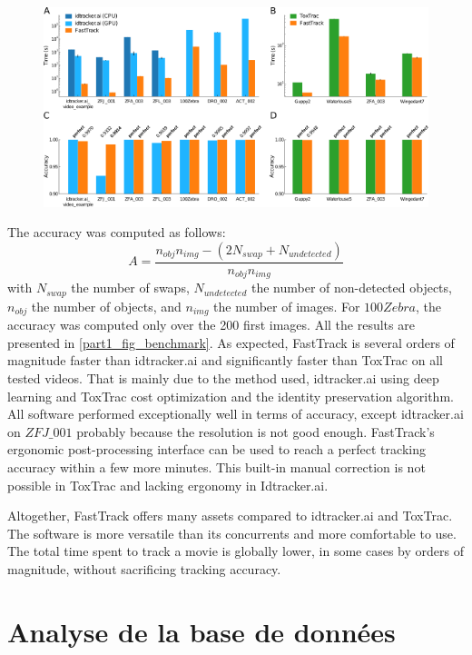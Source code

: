 	\begin{figure}[h!]
    \centering
    \includegraphics[width=\textwidth]{part_1/assets/Figure_benchmark.png}
    \caption{\textbf{} }
    \label{part_1:fig_benchmark}
    \end{figure}

    The accuracy was computed as follows:
    $$ A=\frac{n_{obj}n_{img} - (2N_{swap} + N_{undetected})}{n_{obj}n_{img}}$$
    with $N_{swap}$ the number of swaps, $N_{undetected}$ the number of non-detected objects, $n_{obj}$ the number of objects, and $n_{img}$ the number of images.
    For $100Zebra$, the accuracy was computed only over the 200 first images. All the results are presented in \ref{part1_fig_benchmark}. As expected, FastTrack is several orders of magnitude faster than idtracker.ai and significantly faster than ToxTrac on all tested videos. That is mainly due to the method used, idtracker.ai using deep learning and ToxTrac cost optimization and the identity preservation algorithm.
    All software performed exceptionally well in terms of accuracy, except idtracker.ai on $ZFJ\_001$ probably because the resolution is not good enough.
    FastTrack's ergonomic post-processing interface can be used to reach a perfect tracking accuracy within a few more minutes. This built-in manual correction is not possible in ToxTrac and lacking ergonomy in Idtracker.ai.

    Altogether, FastTrack offers many assets compared to idtracker.ai and ToxTrac. The software is more versatile than its concurrents and more comfortable to use. The total time spent to track a movie is globally lower, in some cases by orders of magnitude, without sacrificing tracking accuracy.

	\section{Analyse de la base de données}

